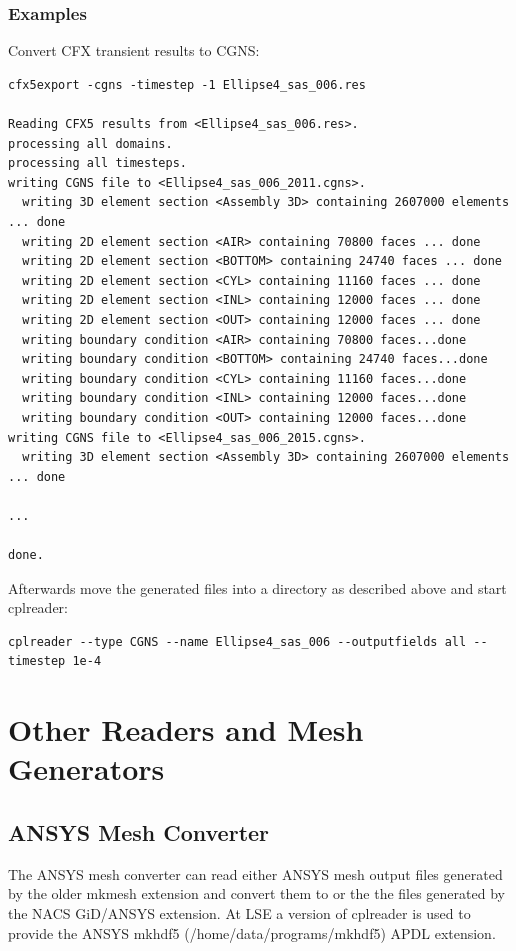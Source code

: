 \documentclass[a4paper,10pt]{article}
\begin{document}
\subsubsection{Examples}

Convert CFX transient results to CGNS:

\begin{verbatim}
cfx5export -cgns -timestep -1 Ellipse4_sas_006.res

Reading CFX5 results from <Ellipse4_sas_006.res>.
processing all domains.
processing all timesteps.
writing CGNS file to <Ellipse4_sas_006_2011.cgns>.
  writing 3D element section <Assembly 3D> containing 2607000 elements ... done
  writing 2D element section <AIR> containing 70800 faces ... done
  writing 2D element section <BOTTOM> containing 24740 faces ... done
  writing 2D element section <CYL> containing 11160 faces ... done
  writing 2D element section <INL> containing 12000 faces ... done
  writing 2D element section <OUT> containing 12000 faces ... done
  writing boundary condition <AIR> containing 70800 faces...done
  writing boundary condition <BOTTOM> containing 24740 faces...done
  writing boundary condition <CYL> containing 11160 faces...done
  writing boundary condition <INL> containing 12000 faces...done
  writing boundary condition <OUT> containing 12000 faces...done
writing CGNS file to <Ellipse4_sas_006_2015.cgns>.
  writing 3D element section <Assembly 3D> containing 2607000 elements ... done

...

done.
\end{verbatim}%
%
Afterwards move  the generated files into  a directory as  described above and
start cplreader:

\begin{verbatim}
cplreader --type CGNS --name Ellipse4_sas_006 --outputfields all --timestep 1e-4
\end{verbatim}

\newpage
\section{Other Readers and Mesh Generators}
\subsection{ANSYS Mesh Converter}
\label{sec:ansys}

The ANSYS mesh converter can read  either ANSYS mesh output files generated by
the older mkmesh extension and convert them to \hdf or the the files generated
by the  NACS GiD/ANSYS  extension. At LSE  a version  of cplreader is  used to
provide the ANSYS mkhdf5 (/home/data/programs/mkhdf5) APDL extension.
\end{document}
